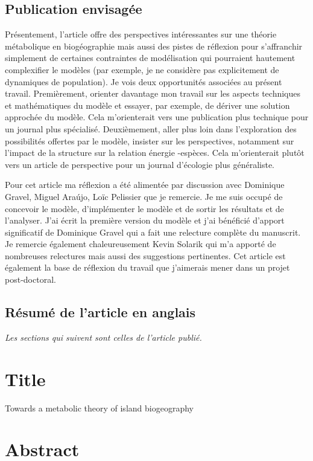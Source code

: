 \subsection{Publication envisagée}

Présentement, l'article offre des perspectives intéressantes sur une
théorie métabolique en biogéographie mais aussi des pistes de réflexion
 pour s'affranchir simplement de certaines contraintes de modélisation
qui pourraient hautement  complexifier le modèles (par exemple,  je ne considère
pas explicitement de dynamiques de population). Je vois deux opportunités
associées au présent travail. Premièrement, orienter davantage mon travail
sur les aspects techniques et mathématiques du modèle et essayer,
par exemple, de dériver une solution approchée du modèle.
Cela m'orienterait vers une publication plus technique
pour un journal plus spécialisé. Deuxièmement, aller plus loin dans l'exploration
des possibilités offertes par le modèle, insister sur les perspectives, notamment
sur l'impact de la structure sur la relation énergie -espèces. Cela m'orienterait plutôt vers
un article de perspective pour un journal d’écologie plus généraliste.


Pour cet article ma réflexion a été alimentée par discussion avec Dominique Gravel,
Miguel Araújo, Loïc Pelissier que je remercie. Je me suis occupé de concevoir le modèle,
d'implémenter le modèle et de sortir les résultats et de l'analyser.
J'ai écrit la première version du modèle et j'ai bénéficié d'apport significatif
de Dominique Gravel qui a fait une relecture complète du manuscrit. Je remercie
également chaleureusement Kevin Solarik qui m'a apporté de nombreuses
relectures mais aussi des suggestions pertinentes.
Cet article est également la base de réflexion du travail que
j’aimerais mener dans un projet post-doctoral.


\subsection{Résumé de l'article en anglais}



\emph{Les sections qui suivent sont celles de l'article publié.}
\section{Title}\label{title}

Towards a metabolic theory of island biogeography

\section{Abstract}\label{abstract}

